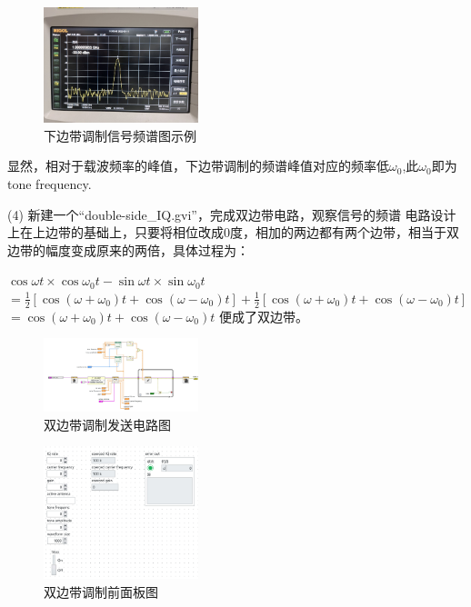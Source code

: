 \documentclass{../source/Experiment}
\begin{document}
\begin{figure}[H]
    \centering
    \includegraphics[width = 0.4\textwidth,angle=180]{lab9/6.jpg}
    \caption{下边带调制信号频谱图示例}
\end{figure}
显然，相对于载波频率的峰值，下边带调制的频谱峰值对应的频率低$\omega_0$,此$\omega_0$即为tone frequency.


(4) 新建一个“double-side\_IQ.gvi”，完成双边带电路，观察信号的频谱
电路设计上在上边带的基础上，只要将相位改成0度，相加的两边都有两个边带，相当于双边带的幅度变成原来的两倍，具体过程为：

$\cos \omega t \times \cos \omega_{0} t-\sin \omega t \times \sin \omega_{0} t$
$=\frac{1}{2}\left[\cos \left(\omega+\omega_{0}\right) t+\cos \left(\omega-\omega_{0}\right) t\right]+\frac{1}{2}\left[\cos \left(\omega+\omega_{0}\right) t+\cos \left(\omega-\omega_{0}\right) t\right]$
$=\cos \left(\omega+\omega_{0}\right) t+\cos \left(\omega-\omega_{0}\right) t$
便成了双边带。

\begin{figure}[H]
    \centering
    \includegraphics[width = 0.4\textwidth]{lab9/double-side_IQ-a.jpg}
    \caption{双边带调制发送电路图}
\end{figure}
\begin{figure}[H]
    \centering
    \includegraphics[width = 0.4\textwidth]{lab9/double-side_IQ-b.jpg}
    \caption{双边带调制前面板图}
\end{figure}
\end{document}
